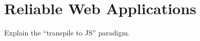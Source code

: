 \chapter{Reliable Web Applications}%
\label{cha:reliable_web_applications}

Explain the ``transpile to JS'' paradigm.
